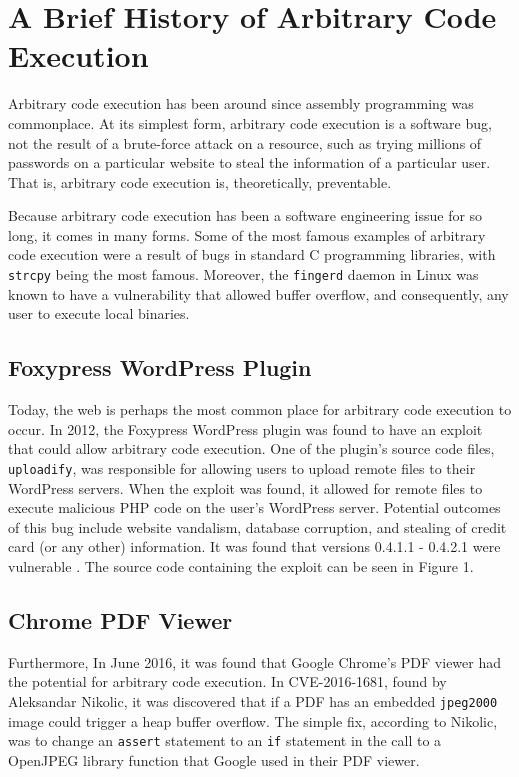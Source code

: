 \section{A Brief History of Arbitrary Code Execution}

Arbitrary code execution has been around since assembly programming was commonplace. At its simplest form, arbitrary code execution is a software bug, not the result of a brute-force attack on a resource, such as trying millions of passwords on a particular website to steal the information of a particular user. That is, arbitrary code execution is, theoretically, preventable.

Because arbitrary code execution has been a software engineering issue for so long, it comes in many forms. Some of the most famous examples of arbitrary code execution were a result of bugs in standard C programming libraries, with \texttt{strcpy} being the most famous. Moreover, the \texttt{fingerd} daemon in Linux was known to have a vulnerability that allowed buffer overflow, and consequently, any user to execute local binaries.

\subsection{Foxypress WordPress Plugin}

Today, the web is perhaps the most common place for arbitrary code execution to occur. In 2012, the Foxypress WordPress plugin was found to have an exploit that could allow arbitrary code execution. One of the plugin’s source code files, \texttt{uploadify}, was responsible for allowing users to upload remote files to their WordPress servers. When the exploit was found, it allowed for remote files to execute malicious PHP code on the user’s WordPress server. Potential outcomes of this bug include website vandalism, database corruption, and stealing of credit card (or any other) information. It was found that versions 0.4.1.1 - 0.4.2.1 were vulnerable \cite{foxypress_2012}. The source code containing the exploit can be seen in Figure 1.

\subsection{Chrome PDF Viewer}

Furthermore, In June 2016, it was found that Google Chrome’s PDF viewer had the potential for arbitrary code execution. In CVE-2016-1681, found by Aleksandar Nikolic, it was discovered that if a PDF has an embedded \texttt{jpeg2000} image could trigger a heap buffer overflow. The simple fix, according to Nikolic, was to change an \texttt{assert} statement to an \texttt{if} statement in the call to a  OpenJPEG library function that Google used in their PDF viewer. \cite{chrome_pdf_2016}

